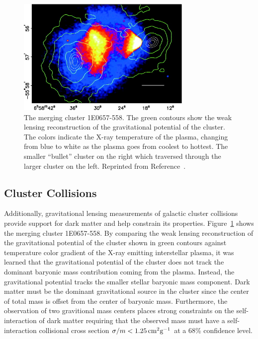 \begin{figure}[htbp]
  \centering
  \includegraphics[width=0.75\textwidth]{DarkMatter/Figures/bullet_cluster.jpg}
  \caption{
    The merging cluster 1E0657-558.
    The green contours show the weak lensing reconstruction of the gravitational potential of the cluster.
    The colors indicate the X-ray temperature of the plasma, changing from blue to white as the plasma goes from coolest to hottest.
    The smaller ``bullet'' cluster on the right which traversed through the larger cluster on the left.
    Reprinted from Reference~\cite{}. %
  }
  \label{fig:bullet_cluster}
\end{figure}

\subsection{Cluster Collisions}
\label{sec:dm_bullet}

Additionally, gravitational lensing measurements of galactic cluster collisions provide support for dark matter and help constrain its properties.
Figure~\ref{fig:bullet_cluster} shows the merging cluster 1E0657-558.
By comparing the weak lensing reconstruction of the gravitational potential of the cluster shown in green contours against temperature color gradient of the X-ray emitting interstellar plasma, it was learned that the gravitational potential of the cluster does not track the dominant baryonic mass contribution coming from the plasma.
Instead, the gravitational potential tracks the smaller stellar baryonic mass component.
Dark matter must be the dominant gravitational source in the cluster since the center of total mass is offset from the center of baryonic mass.
Furthermore, the observation of two gravitional mass centers places strong constraints on the self-interaction of dark matter requiring that the observed mass must have a self-interaction collisional cross section $\sigma/m < 1.25\,\text{cm}^2\text{g}^{-1}$ at a 68\% confidence level.

